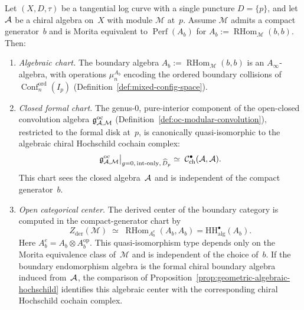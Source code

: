 \begin{theorem}
\label{thm:thqg-local-global-bridge}
Let $(X, D, \tau)$ be a tangential log curve with a single
puncture $D = \{p\}$, and let $\mathcal{A}$ be a chiral algebra on~$X$
with module $\mathcal{M}$ at~$p$. Assume $\mathcal{M}$ admits
a compact generator~$b$ and is Morita equivalent to
$\operatorname{Perf}(A_b)$ for
$A_b:=\operatorname{RHom}_{\mathcal M}(b,b)$. Then:
\begin{enumerate}[label=\textup{(\roman*)}]
\item \emph{Algebraic chart.}
 The boundary algebra
 $A_b := \operatorname{RHom}_{\mathcal{M}}(b, b)$
 is an $A_\infty$-algebra, with operations $\mu_n^{A_b}$ encoding
 the ordered boundary collisions of
 $\operatorname{Conf}^{\mathrm{ord}}_n(I_p)$
 (Definition~\ref{def:mixed-config-space}).

\item \emph{Closed formal chart.}
 The genus-$0$, pure-interior component of the open-closed
 convolution algebra
 $\mathfrak{g}^{\mathrm{oc}}_{\mathcal{A}, \mathcal{M}}$
 (Definition~\ref{def:oc-modular-convolution}), restricted to
 the formal disk at~$p$, is canonically quasi-isomorphic to the
 algebraic chiral Hochschild cochain complex:
 \begin{equation}\label{eq:thqg-local-global-identification}
 \mathfrak{g}^{\mathrm{oc}}_{\mathcal{A}, \mathcal{M}}
 \bigl|_{g=0,\, \text{int-only},\, \widehat{D}_p}
 \;\simeq\;
 \mathcal{C}^{\bullet}_{\mathrm{ch}}(\mathcal{A}, \mathcal{A}).
 \end{equation}
 This chart sees the closed algebra~$\mathcal{A}$ and is independent of the
 compact generator~$b$.

\item \emph{Open categorical center.}
 The derived center of the boundary category is computed in the
 compact-generator chart by
 \[
 Z_{\mathrm{der}}(\mathcal M)
 \;\simeq\;
 \operatorname{RHom}_{A_b^e}(A_b,A_b)
 =
 \mathrm{HH}^{\bullet}_{\mathrm{alg}}(A_b).
 \]
 Here $A_b^e=A_b\otimes A_b^{\mathrm{op}}$.
 This quasi-isomorphism type depends only on the Morita
 equivalence class of~$\mathcal M$ and is independent of the choice
 of~$b$.
 If the boundary endomorphism algebra is the formal chiral
 boundary algebra induced from~$\mathcal{A}$, the comparison of
 Proposition~\ref{prop:geometric-algebraic-hochschild} identifies
 this algebraic center with the corresponding chiral Hochschild
 cochain complex.
\end{enumerate}
\end{theorem}

